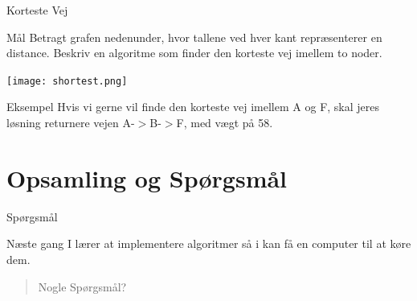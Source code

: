 \documentclass[12pt,t]{beamer}
\begin{document}
    \begin{frame}{Korteste Vej}
      \begin{block}{Mål}
        Betragt grafen nedenunder, hvor tallene ved hver kant repræsenterer 
        en distance. Beskriv en algoritme som finder den korteste vej imellem 
        to noder.
      \end{block}
      \texttt{[image: shortest.png]}
      \begin{exampleblock}{Eksempel}
        Hvis vi gerne vil finde den korteste vej imellem A og F, skal jeres 
        løsning returnere vejen A-$>$B-$>$F, med vægt på 58.
      \end{exampleblock}
    \end{frame}


\section{Opsamling og Spørgsmål}
    \begin{frame}[c]{Spørgsmål}
        \begin{block}{Næste gang}
            I lærer at implementere algoritmer så i kan få en computer til at
            køre dem.
        \end{block}
        \begin{quote}
            \centering Nogle Spørgsmål?
        \end{quote}
    \end{frame}
\end{document}
